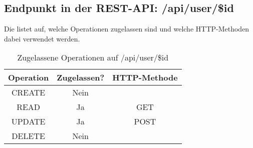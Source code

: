 \subsection{Endpunkt in der REST-API: /api/user/\$id}
Die  listet auf, welche Operationen zugelassen sind und welche HTTP-Methoden dabei verwendet werden. 

\begin{table}[!htbp]
	\begin{tabular}{|c|c|c|}
		\hline
			\textbf{Operation} & \textbf{Zugelassen?} & \textbf{HTTP-Methode} \\ \hline
			CREATE & Nein & \\ \hline  
			READ & Ja & GET \\ \hline
			UPDATE & Ja & POST \\ \hline 
			DELETE & Nein & \\ \hline
	\end{tabular}

		\caption{Zugelassene Operationen auf /api/user/\$id}
		\label{tab:end:rest:api:user:id:meth}
\end{table}